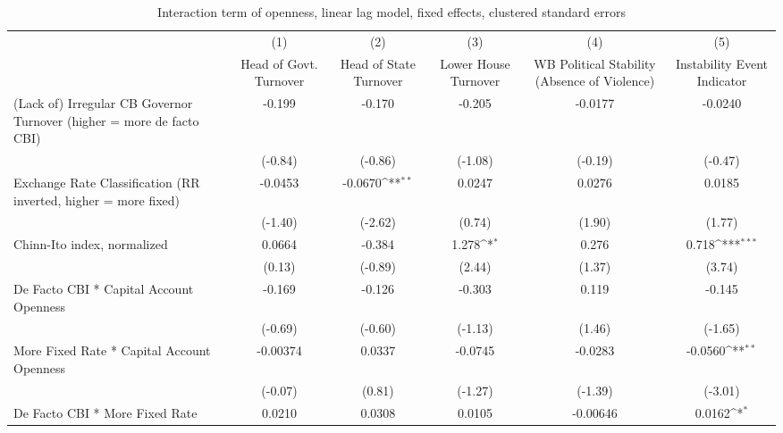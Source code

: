 {
\def\sym#1{\ifmmode^{#1}\else\(^{#1}\)\fi}
\begin{longtable}{l*{5}{c}}
\caption{Interaction term of openness, linear lag model, fixed effects, clustered standard errors \label{kapintlagsDF}}\\
\hline\hline\endfirsthead\hline\endhead\hline\endfoot\endlastfoot
                &\multicolumn{1}{c}{(1)}&\multicolumn{1}{c}{(2)}&\multicolumn{1}{c}{(3)}&\multicolumn{1}{c}{(4)}&\multicolumn{1}{c}{(5)}\\
                &\multicolumn{1}{c}{Head of Govt. Turnover}&\multicolumn{1}{c}{Head of State Turnover}&\multicolumn{1}{c}{Lower House Turnover}&\multicolumn{1}{c}{WB Political Stability (Absence of Violence)}&\multicolumn{1}{c}{Instability Event Indicator}\\
\hline
(Lack of) Irregular CB Governor Turnover (higher = more de facto CBI)&   -0.199         &   -0.170         &   -0.205         &  -0.0177         &  -0.0240         \\
                &  (-0.84)         &  (-0.86)         &  (-1.08)         &  (-0.19)         &  (-0.47)         \\
[1em]
Exchange Rate Classification (RR inverted, higher = more fixed)&  -0.0453         &  -0.0670\sym{**} &   0.0247         &   0.0276         &   0.0185         \\
                &  (-1.40)         &  (-2.62)         &   (0.74)         &   (1.90)         &   (1.77)         \\
[1em]
Chinn-Ito index, normalized&   0.0664         &   -0.384         &    1.278\sym{*}  &    0.276         &    0.718\sym{***}\\
                &   (0.13)         &  (-0.89)         &   (2.44)         &   (1.37)         &   (3.74)         \\
[1em]
De Facto CBI * Capital Account Openness&   -0.169         &   -0.126         &   -0.303         &    0.119         &   -0.145         \\
                &  (-0.69)         &  (-0.60)         &  (-1.13)         &   (1.46)         &  (-1.65)         \\
[1em]
More Fixed Rate * Capital Account Openness& -0.00374         &   0.0337         &  -0.0745         &  -0.0283         &  -0.0560\sym{**} \\
                &  (-0.07)         &   (0.81)         &  (-1.27)         &  (-1.39)         &  (-3.01)         \\
[1em]
De Facto CBI * More Fixed Rate&   0.0210         &   0.0308         &   0.0105         & -0.00646         &   0.0162\sym{*}  \\

\end{longtable}}
